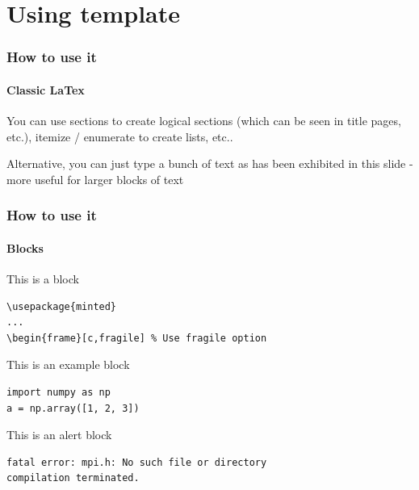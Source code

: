 \documentclass[11pt,t,aspectratio=169]{beamer} %
\begin{document}
\section{Using template}


    \begin{frame}[c,fragile]
        \frametitle{How to use it}
        \framesubtitle{Classic LaTex}

        You can use sections to create logical sections (which can be seen in title pages, etc.), itemize / enumerate to create lists, etc..

        Alternative, you can just type a bunch of text as has been exhibited in this slide - more useful for larger blocks of text
    \end{frame}

    \begin{frame}[c,fragile]
        \frametitle{How to use it}
        \framesubtitle{Blocks}
        \begin{block}{This is a block}
            \begin{verbatim}
\usepackage{minted}
...
\begin{frame}[c,fragile] % Use fragile option
            \end{verbatim}
        \end{block}
        
        \begin{exampleblock}{This is an example block}
            \begin{verbatim}
import numpy as np
a = np.array([1, 2, 3])
            \end{verbatim}
        \end{exampleblock}
        
        \begin{alertblock}{This is an alert block}
            \begin{verbatim}
fatal error: mpi.h: No such file or directory
compilation terminated.
            \end{verbatim}
        \end{alertblock}
    
    \end{frame}
\end{document}
